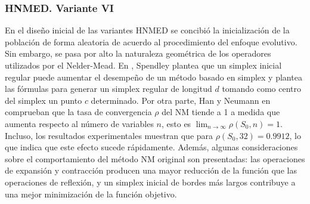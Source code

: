 \subsubsection{HNMED. Variante VI}
En el diseño inicial de las variantes HNMED se concibió la inicialización de la población de forma aleatoria de acuerdo al procedimiento del enfoque evolutivo. Sin embargo, se pasa por alto la naturaleza geométrica de los operadores utilizados por el Nelder-Mead. En \cite{spendley_sequential_1962}, Spendley plantea que un simplex inicial regular puede aumentar el desempeño de un método basado en simplex y plantea las fórmulas para generar un simplex regular de longitud $d$ tomando como centro del simplex un punto $c$ determinado. Por otra parte, Han y Neumann en \cite{han_effect_2006} comprueban que la tasa de convergencia $\rho$ del NM tiende a 1 a medida que aumenta respecto al número de variables $n$, esto es $ \lim_{n\to\infty}\rho(S_0,n)=1$. Incluso, los resultados experimentales muestran que para $\rho(S_0,32)=0.9912$, lo que indica que este efecto sucede rápidamente. Además, algunas consideraciones sobre el comportamiento del método NM original son presentadas: las operaciones de expansión y contracción producen una mayor reducción de la función que las operaciones de reflexión, y un simplex inicial de bordes más largos contribuye a una mejor minimización de la función objetivo. 

